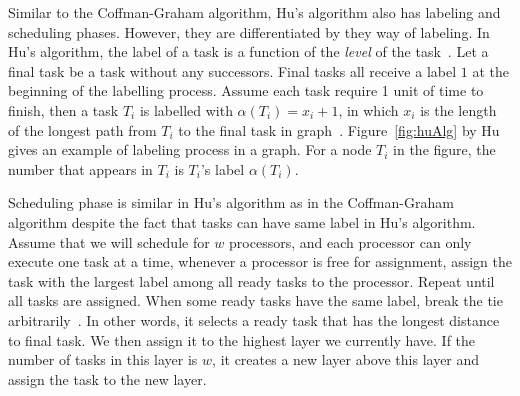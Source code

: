 \documentclass[letterpaper,12pt]{article}
\theoremstyle{definition}
\begin{document}
Similar to the Coffman-Graham algorithm, Hu's algorithm also has labeling and scheduling phases. However, they are differentiated by they way of labeling. In Hu's algorithm, the label of a task is a function of the \textit{level} of the task~\cite{huo_online_2005}. Let a final task be a task without any successors. Final tasks all receive a label $1$ at the beginning of the labelling process. Assume each task require 1 unit of time to finish, then a task $T_i$ is labelled with $\alpha(T_i)=x_i + 1$, in which $x_i$ is the length of the longest path from $T_i$ to the final task in graph~\cite{hu_parallel_1961}. Figure~\ref{fig:huAlg} by Hu gives an example of labeling process in a graph. For a node $T_i$ in the figure, the number that appears in $T_i$ is $T_i$'s label $\alpha(T_i)$.

Scheduling phase is similar in Hu's algorithm as in the Coffman-Graham algorithm despite the fact that tasks can have same label in Hu's algorithm. Assume that we will schedule for $w$ processors, and each processor can only execute one task at a time, whenever a processor is free for assignment, assign the task with the largest label among all ready tasks to the processor. Repeat until all tasks are assigned. When some ready tasks have the same label, break the tie arbitrarily~\cite{leung_basic_2004}. In other words, it selects a ready task that has the longest distance to final task. We then assign it to the highest layer we currently have. If the number of tasks in this layer is $w$, it creates a new layer above this layer and assign the task to the new layer. 
\end{document}
